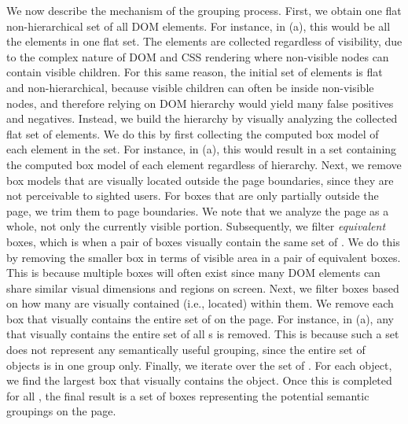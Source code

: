 We now describe the mechanism of the grouping process.
First, we obtain one flat non-hierarchical set of all DOM elements. 
For instance, in (a), 
this would be all the  elements in one flat set.
The elements are collected regardless of visibility, due to the complex 
nature of DOM and CSS rendering where non-visible nodes can contain visible children.
For this same reason, the initial set of elements is flat and non-hierarchical, 
because visible children can often be inside non-visible nodes, and therefore relying 
on DOM hierarchy would yield many false positives and negatives. 
Instead, we build the hierarchy by visually analyzing the collected flat set of elements.
We do this by first collecting the computed box model of each element in the set. 
For instance, in (a), this would result in a set containing 
the computed box model of each  element regardless of hierarchy.
Next, we remove box models that are visually located outside the page boundaries, 
since they are not perceivable to sighted users.
For boxes that are only partially outside the page, we trim them to page boundaries. We note that we analyze the page as a whole, 
not only the currently visible portion. 
Subsequently, we filter \emph{equivalent} boxes, which is when a pair of boxes 
visually contain the same set of {\vizobjs}.
We do this by removing the smaller box in terms of visible area in a pair of equivalent boxes. This is because multiple boxes will often 
exist since many DOM elements can share similar visual dimensions 
and regions on screen. 
Next, we filter boxes based on how many {\vizobjs} are visually contained (i.e., located) 
within them. We remove each box that visually contains the entire set of {\vizobjs} on the page. 
For instance, in (a), any  that 
visually contains the entire set of all s is removed.
This is because such a set does not represent any semantically useful grouping, 
since the entire set of objects is in one group only. 
Finally, we iterate over the set of {\vizobjs}. 
For each object, we find the largest box that visually contains the object. 
Once this is completed for all {\vizobjs}, the final result is a set of boxes representing 
the potential semantic groupings on the page.


